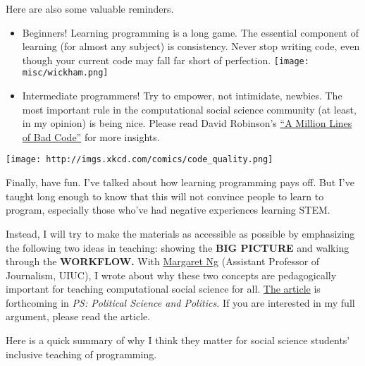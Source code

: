 \documentclass[
]{book}
\begin{document}
Here are also some valuable reminders.

\begin{itemize}
\item
  Beginners! Learning programming is a long game. The essential component of learning (for almost any subject) is consistency. Never stop writing code, even though your current code may fall far short of perfection.
  \texttt{[image: misc/wickham.png]}
\item
  Intermediate programmers! Try to empower, not intimidate, newbies. The most important rule in the computational social science community (at least, in my opinion) is being nice. Please read David Robinson's \href{http://varianceexplained.org/programming/bad-code/}{``A Million Lines of Bad Code''} for more insights.
\end{itemize}

\texttt{[image: http://imgs.xkcd.com/comics/code\_quality.png]}

Finally, have fun. I've talked about how learning programming pays off. But I've taught long enough to know that this will not convince people to learn to program, especially those who've had negative experiences learning STEM.

Instead, I will try to make the materials as accessible as possible by emphasizing the following two ideas in teaching: showing the \textbf{BIG PICTURE} and walking through the \textbf{WORKFLOW.} With \href{https://media.illinois.edu/margaret-yee-man-ng}{Margaret Ng} (Assistant Professor of Journalism, UIUC), I wrote about why these two concepts are pedagogically important for teaching computational social science for all. \href{https://osf.io/preprints/socarxiv/pf7n6/?fbclid=IwAR2ZI0yw_pehS0mxAmeUBOGpzIhiO2LMUPGBzBLTLNo4C2HrJSoH9uZhgTY}{The article} is forthcoming in \emph{PS: Political Science and Politics.} If you are interested in my full argument, please read the article.

Here is a quick summary of why I think they matter for social science students' inclusive teaching of programming.
\end{document}
